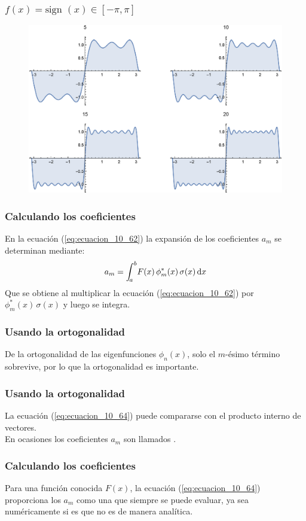 \documentclass[12pt]{beamer}
\begin{document}
\begin{frame}
\frametitle{$f (x) = \mbox{sign } (x) \in [-\pi, \pi]$}
\begin{figure}
  \centering
  \includegraphics[scale=0.7]{Imagenes/Gibbs_Fourier.eps}
\end{figure}
\end{frame}
\begin{frame}
\frametitle{Calculando los coeficientes}
En la ecuación (\ref{eq:ecuacion_10_62}) la expansión de los coeficientes $a_{m}$ se determinan mediante:
\pause
\begin{align}
a_{m} = \scaleint{5ex}_{\bs a}^{b} F(x) \, \phi_{m}^{*} (x) \, \sigma (x) \dd{x}
\label{eq:ecuacion_10_64}
\end{align}
\pause
Que se obtiene al multiplicar la ecuación (\ref{eq:ecuacion_10_62}) por $\phi_{m}^{*} (x) \, \sigma (x)$ y luego se integra.
\end{frame}
\begin{frame}
\frametitle{Usando la ortogonalidad}
De la ortogonalidad de las eigenfunciones $\phi_{n} (x)$, solo el $m$-ésimo término sobrevive, por lo que la ortogonalidad es importante.
\end{frame}
\begin{frame}
\frametitle{Usando la ortogonalidad}
La ecuación (\ref{eq:ecuacion_10_64}) puede compararse con el producto interno de vectores.
\\
\bigskip
\pause
En ocasiones los coeficientes $a_{m}$ son llamados .
\end{frame}
\begin{frame}
\frametitle{Calculando los coeficientes}
Para una función conocida $F (x)$, la ecuación (\ref{eq:ecuacion_10_64}) proporciona los $a_{m}$ como una  que siempre se puede evaluar, ya sea numéricamente si es que no es de manera analítica.
\end{frame}
\end{document}
